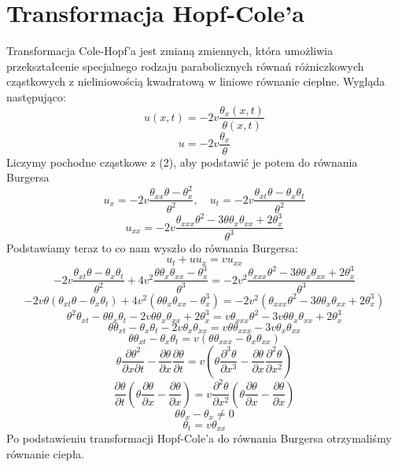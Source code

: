 \documentclass[a4paper,12pt]{article}
\begin{document}
\section{Transformacja Hopf-Cole'a}
Transformacja Cole-Hopf’a jest zmianą zmiennych, która umożliwia przekształcenie specjalnego rodzaju parabolicznych równań różniczkowych cząstkowych z nieliniowością kwadratową w liniowe równanie cieplne. Wygląda następująco:
\begin{equation}
u(x,t)=-2v\frac{\theta _x (x,t)}{\theta (x,t)}
\end{equation}
$$u=-2v\frac{\theta _x}{\theta}$$
Liczymy pochodne cząstkowe z (2), aby podstawić je potem do równania Burgersa
	$$u_x=-2v\frac{\theta _{xx} \theta - \theta ^{2}_{x}}{\theta ^2}, \quad u_t=-2v\frac{\theta _{xt}\theta - \theta _x \theta _t}{\theta ^2}$$
	$$u_{xx}=-2v\frac{\theta _{xxx}\theta ^2 - 3\theta \theta _x \theta _{xx} + 2\theta ^{3}_{x}}{\theta ^3}$$
	Podstawiamy teraz to co nam wyszło do równania Burgersa:
	$$u_t + u u_x = v u_{xx}$$
$$-2v \frac{\theta _{xt}\theta - \theta _x \theta _t }{\theta ^2} + 4 v^2 \frac{\theta \theta _x \theta _{xx} - \theta ^{3}_{x}}{\theta ^3} = -2v^2\frac{\theta _{xxx} \theta ^2 - 3\theta \theta _x \theta _{xx} + 2\theta ^{3}_{x}}{\theta ^3}$$
$$-2v\theta (\theta _{xt} \theta - \theta _x \theta _t ) +4v^2 (\theta \theta _x \theta _{xx} - \theta ^{3}_{x}) = -2v^2(\theta _{xxx} \theta ^2 - 3\theta \theta _x \theta _{xx} + 2\theta ^{3}_{x})$$
$$\theta ^2 \theta _{xt} - \theta \theta _x \theta _t -2v \theta \theta _x \theta _{xx} +2\theta^{3}_{x}=v \theta _{xxx} \theta ^2 -3v\theta \theta _x \theta _{xx} +2 \theta ^{3}_{x}$$
$$\theta \theta _{xt} - \theta _x \theta _t -2v\theta _x \theta _{xx}= v\theta \theta _{xxx} - 3v\theta _x \theta _{xx}$$
$$\theta \theta _{xt} - \theta _x \theta _t = v(\theta \theta _{xxx} - \theta _x \theta _{xx})$$
$$\theta \frac{\partial 
\theta ^2}{\partial x \partial t}- \frac{\partial \theta}{\partial x} \frac{\partial \theta}{\partial t} = v(\theta \frac{\partial ^3 \theta}{\partial x^3}-\frac{\partial \theta}{\partial x}\frac{\partial ^2 \theta}{\partial x^2})$$
$$\frac{\partial \theta}{\partial t}(\theta \frac{\partial \theta}{\partial x}-\frac{\partial \theta}{\partial x})=v\frac{\partial ^2 \theta}{\partial x^2}(\theta \frac{\partial \theta}{\partial x}-\frac{\partial \theta}{\partial x})$$
$$\theta \theta _x - \theta _x \neq 0$$
$$ \theta _t = v \theta _{xx}$$
Po podstawieniu transformacji Hopf-Cole'a do równania Burgersa otrzymaliśmy równanie ciepła.
\end{document}
